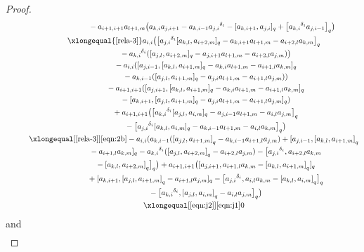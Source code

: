 \documentclass[pdftex]{sigma}
\numberwithin{equation}{section}
\def\lr#1{\left[#1\right]}
\def\d{\delta}
\begin{document}
\begin{proof}
\begin{gather*}
 \quad\qquad\qquad\qquad\ \ {} -a_{i+1,i+1}a_{l+1,m} \bigl(a_{k,i}a_{j,i+1}-a_{k,i-1}{a_{j,i}}^{\d_i}- [a_{k,i+1},a_{j,i} ]_q+ \bigl[{a_{k,i}}^{\d_i} a_{j,i-1} \bigr]_q \bigr)\\
 \quad\qquad\xlongequal{\eqref{rela-3}} a_{i,i} \bigl( \bigl[{a_{j,i}}^{\d_i} [a_{k,l},a_{i+2,m} ]_q -a_{k,i+1}a_{l+1,m}-a_{i+2,l}a_{k,m} \bigr]_q \\[-0.5mm]
\quad\qquad\qquad\quad {} -{a_{k,i}}^{\d_i} ( [a_{j,l},a_{i+2,m} ]_q
-a_{j,i+1}a_{l+1,m} {}-a_{i+2,l}a_{j,m} ) \bigr)\\
 \quad\qquad\qquad\quad {}-a_{i,i} ( [a_{j,i-1}, [a_{k,l},a_{i+1,m} ]_q
-a_{k,i}a_{l+1,m} -a_{i+1,l}a_{k,m} ]_q \\
\quad\qquad\qquad\quad {}-a_{k,i-1} ( [a_{j,l},a_{i+1,m} ]_q-a_{j,i}a_{l+1,m} -a_{i+1,l}a_{j,m} ) )\\
 \quad\qquad\qquad\quad {}-a_{i+1,i+1} ( [a_{j,i+1}, [a_{k,l},a_{i+1,m} ]_q-a_{k,i} a_{l+1,m}-a_{i+1,l}a_{k,m} ]_q \\
\quad\qquad\qquad \quad {}- [a_{k,i+1}, [a_{j,l},a_{i+1,m} ]_q-a_{j,i}a_{l+1,m} -a_{i+1,l}a_{j,m} ]_q )\\
 \quad\qquad\qquad \quad {}+a_{i+1,i+1} \bigl( \bigl[{a_{k,i}}^{\d_i} [a_{j,l},a_{i,m} ]_q -a_{j,i-1}a_{l+1,m}-a_{i,l}a_{j,m} \bigr]_q \\
\quad\qquad\qquad\quad {}- \bigl[{a_{j,i}}^{\d_i} [a_{k,l},a_{i,m} ]_q-a_{k,i-1}a_{l+1,m} -a_{i,l}a_{k,m} \bigr]_q \bigr)\\[-0.5mm]
\quad\qquad \xlongequal[\eqref{rela-3}]{\eqref{eqn:2b}} - a_{i,i} (a_{k,i-1}(\lr{a_{j,l}, a_{i+1,m}}_q-a_{k,i-1}a_{i+1,l}a_{j,m})+[a_{j,i-1}, \lr{a_{k,l},a_{i+1,m}}_q\\[-0.5mm]
\quad\qquad\qquad \quad {}-a_{i+1,l}a_{k,m}]_q -{a_{k,i}}^{\d_i}(\lr{a_{j,l},a_{i+2,m}}_q-a_{i+2,l}a_{j,m})-\bigl[{a_{j,i}}^{\d_i}, a_{i+2,l}a_{k,m}\\
 \quad\qquad\qquad\quad {}-\lr{a_{k,l},a_{i+2,m}}_q\bigr]_q \bigr)+a_{i+1,i+1} \bigl([a_{j,i+1}, a_{i+1,l}a_{k,m} -\lr{a_{k,l},a_{i+1,m}}_q]_q \\
\quad\qquad\qquad\quad {}+[a_{k,i+1},\lr{a_{j,l},a_{i+1,m}}_q -a_{i+1,l}a_{j,m}]_q -\bigl[{a_{j,i}}^{\d_i},a_{i,l}a_{k,m}-\lr{a_{k,l},a_{i,m}}_q\bigr]_q \\
\quad\qquad\qquad\quad {}-\bigl[{a_{k,i}}^{\d_i},\lr{a_{j,l},a_{i,m}}_q-a_{i,l}a_{j,m}\bigr]_q \bigr)\\[-0.5mm]
\quad\qquad \xlongequal[\eqref{eqn:j2}]{\eqref{eqn:j1}} 0
\end{gather*}
and
\begin{gather*}

\end{gather*}
\end{proof}
\end{document}
